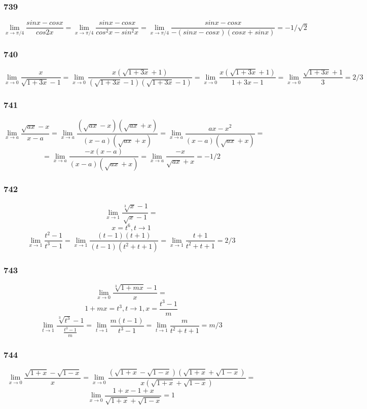 \documentclass[12pt]{article}
\begin{document}
\subsubsection{739}
$$
\lim_{x\to \pi/4} \frac{sinx-cosx}{cos2x}=
\lim_{x\to \pi/4} \frac{sinx-cosx}{cos^2 x- sin^2 x}=
\lim_{x\to \pi/4} \frac{sinx-cosx}{-(sinx-cosx)(cos x+ sin x)}=
-1/\sqrt{2}
$$

\newpage
\subsubsection{740}
$$
\lim_{x\to 0} \frac{x}{\sqrt{1+3x}-1}=
\lim_{x\to 0} \frac{x(\sqrt{1+3x}+1)}{(\sqrt{1+3x}-1)(\sqrt{1+3x}-1)}=
\lim_{x\to 0} \frac{x(\sqrt{1+3x}+1)}{1+3x-1}=
\lim_{x\to 0} \frac{\sqrt{1+3x}+1}{3}=2/3
$$

\newpage
\subsubsection{741}
$$
\lim_{x\to a} \frac{\sqrt{ax}-x}{x-a}=
\lim_{x\to a} \frac{(\sqrt{ax}-x)(\sqrt{ax}+x)}{(x-a)(\sqrt{ax}+x)}=
\lim_{x\to a} \frac{ax-x^2}{(x-a)(\sqrt{ax}+x)}=
$$
$$
=\lim_{x\to a} \frac{-x(x-a)}{(x-a)(\sqrt{ax}+x)}=\lim_{x\to a} \frac{-x}{\sqrt{ax}+x}=-1/2
$$


\newpage
\subsubsection{742}

$$
\lim_{x\to 1} \frac{\sqrt[3]{x}-1}{\sqrt{x}-1}=
$$
$$
x=t^6, t \to 1
$$
$$
\lim_{x\to 1} \frac{t^2-1}{t^3-1}=
\lim_{x\to 1} \frac{(t-1)(t+1)}{(t-1)(t^2+t+1)}=
\lim_{x\to 1} \frac{t+1}{t^2+t+1}=2/3
$$

\newpage
\subsubsection{743}

$$
\lim_{x\to 0} \frac{\sqrt[3]{1+mx}-1}{x}=
$$
$$
1+mx = t^3, t \to 1, x = \frac{t^3-1}{m}
$$
$$
\lim_{t\to 1} \frac{\sqrt[3]{t^3}-1}{\frac{t^3-1}{m}}=
\lim_{t\to 1} \frac{m(t-1)}{t^3-1}=
\lim_{t\to 1} \frac{m}{t^2+t+1}=m/3
$$

\newpage
\subsubsection{744}

$$
\lim_{x\to 0} \frac{\sqrt{1+x}-\sqrt{1-x}}{x}=
\lim_{x\to 0} \frac{(\sqrt{1+x}-\sqrt{1-x})(\sqrt{1+x}+\sqrt{1-x})}{x(\sqrt{1+x}+\sqrt{1-x})}=
$$
$$
\lim_{x\to 0} \frac{1+x-1+x}{\sqrt{1+x}+\sqrt{1-x}}=1
$$
\end{document}
